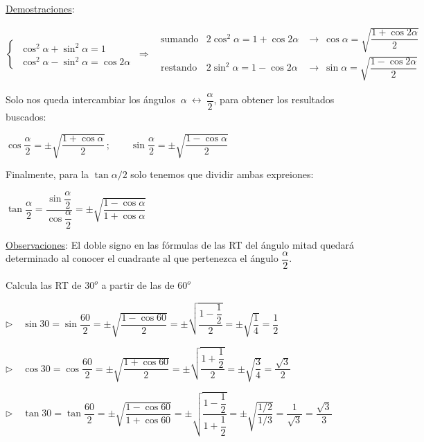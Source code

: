 \underline{Demostraciones}:

$\begin{cases}
\ \cos^2 \alpha + \sin^2 \alpha = 1 \\
\ \cos^2 \alpha - \sin^2 \alpha = \cos 2\alpha 	
\end{cases} \ \Rightarrow \ \begin{array}{lll}
\text{ sumando} & 2\cos^2\alpha=1+\cos 2 \alpha  & \to \ \cos \alpha=\sqrt{\dfrac{1+\cos 2\alpha}{2}}	 \\
\text{ restando} & 2\sin^2\alpha=1-\cos 2 \alpha  & \to \ \sin \alpha=\sqrt{\dfrac{1-\cos 2\alpha}{2}}	
 \end{array}$
 
 Solo nos queda intercambiar los ángulos $\ \alpha \ \leftrightarrow \ \dfrac \alpha 2$, para obtener los resultados buscados:

$\cos \dfrac \alpha 2 =\pm \sqrt{\dfrac{1+\cos \alpha}{2}}\, ; \qquad 
\sin \dfrac \alpha 2 =\pm \sqrt{\dfrac{1-\cos \alpha}{2}}$

Finalmente, para la $\tan \alpha/2$ solo tenemos que dividir ambas expreiones:

$\tan \dfrac \alpha 2=\dfrac{\sin \dfrac \alpha 2}{\cos \dfrac \alpha 2}=\pm \sqrt{\dfrac{1-\cos \alpha}{1+\cos \alpha}}$ \QED
 
\vspace{3mm} \underline{Observaciones}: El doble signo en las fórmulas de las RT del ángulo mitad quedará determinado al conocer el cuadrante al que pertenezca el ángulo $\dfrac \alpha 2$.
 
\vspace{5mm}

\begin{miejemplo}

Calcula las RT de $30^o$ a partir de las de $60^o$


\vspace{4mm} $\triangleright \quad  \sin 30 =\sin \dfrac{60}{2}= \pm\sqrt{\dfrac{1-\cos 60}{2}}=\pm\sqrt{\dfrac{1-\dfrac 12}{2}}=\pm\sqrt{\dfrac 1 4}=\dfrac 12$
			
\vspace{4mm} $\triangleright \quad  \cos 30=\cos \dfrac {60} 2=\pm \sqrt{ \dfrac{1+\cos 60}{2} }= \pm\sqrt{\dfrac{1+\dfrac 12}{2}}=\pm \sqrt{\dfrac{3}{4}}=\dfrac{\sqrt{3}}{2}$

\vspace{4mm} $\triangleright \quad  \tan 30= \tan \dfrac {60} 2=\pm \sqrt
{\dfrac{1-\cos 60}{1+\cos 60}}=\pm \sqrt
{\dfrac{1-\dfrac 1 2}{1+\dfrac 12}}=\pm\sqrt{\dfrac{1/2}{1/3}}=\dfrac{1}{\sqrt{3}}=\dfrac{\sqrt{3}}{3}$


\end{miejemplo}



